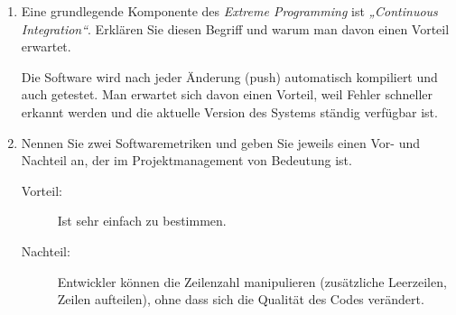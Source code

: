\documentclass{bschlangaul-aufgabe}
\begin{document}
\begin{enumerate}
\begin{bAntwort}
\end{bAntwort}


\item Eine grundlegende Komponente des \emph{Extreme Programming} ist
\emph{„Continuous Integration“}. Erklären Sie diesen Begriff und warum
man davon einen Vorteil erwartet.

\begin{bAntwort}
Die Software wird nach jeder Änderung (push) automatisch kompiliert und
auch getestet. Man erwartet sich davon einen Vorteil, weil Fehler
schneller erkannt werden und die aktuelle Version des Systems ständig
verfügbar ist.
\end{bAntwort}


\item Nennen Sie zwei Softwaremetriken und geben Sie jeweils einen Vor-
und Nachteil an, der im Projektmanagement von Bedeutung
ist.

\begin{bAntwort}

\begin{description}
\item[Vorteil:]

Ist sehr einfach zu bestimmen.

\item[Nachteil:]

Entwickler können die Zeilenzahl manipulieren (zusätzliche Leerzeilen,
Zeilen aufteilen), ohne dass sich die Qualität des Codes verändert.
\end{description}


\end{bAntwort}
\end{enumerate}
\end{document}
